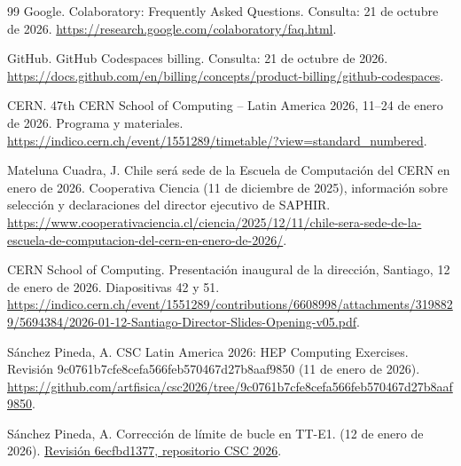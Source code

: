 \begin{thebibliography}{99}
 Google. Colaboratory: Frequently Asked Questions. Consulta: 21 de octubre de 2026. \url{https://research.google.com/colaboratory/faq.html}.

 GitHub. GitHub Codespaces billing. Consulta: 21 de octubre de 2026. \url{https://docs.github.com/en/billing/concepts/product-billing/github-codespaces}.

 CERN. 47th CERN School of Computing -- Latin America 2026, 11--24 de enero de 2026. Programa y materiales. \url{https://indico.cern.ch/event/1551289/timetable/?view=standard_numbered}.

 Mateluna Cuadra, J. Chile será sede de la Escuela de Computación del CERN en enero de 2026. Cooperativa Ciencia (11 de diciembre de 2025), información sobre selección y declaraciones del director ejecutivo de SAPHIR. \url{https://www.cooperativaciencia.cl/ciencia/2025/12/11/chile-sera-sede-de-la-escuela-de-computacion-del-cern-en-enero-de-2026/}.

 CERN School of Computing. Presentación inaugural de la dirección, Santiago, 12 de enero de 2026. Diapositivas 42 y 51. \url{https://indico.cern.ch/event/1551289/contributions/6608998/attachments/3198829/5694384/2026-01-12-Santiago-Director-Slides-Opening-v05.pdf}.

 Sánchez Pineda, A. CSC Latin America 2026: HEP Computing Exercises. Revisión 9c0761b7cfe8cefa566feb570467d27b8aaf9850 (11 de enero de 2026). \url{https://github.com/artfisica/csc2026/tree/9c0761b7cfe8cefa566feb570467d27b8aaf9850}.

 Sánchez Pineda, A. Corrección de límite de bucle en TT-E1. (12 de enero de 2026). \href{https://github.com/artfisica/csc2026/commit/6ecfbd137700e34964b39bd983cdcd99be82f227}{Revisión 6ecfbd1377, repositorio CSC 2026}.
\end{thebibliography}
